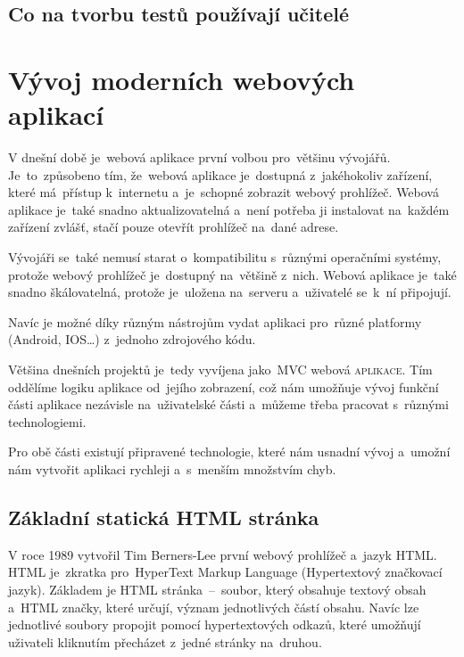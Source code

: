 \documentclass[14pt,a4paper]{article}
\begin{document}
        \subsection{Co na tvorbu testů používají učitelé}

    \section{Vývoj moderních webových aplikací}
    V dnešní době je~webová aplikace první volbou pro~většinu vývojářů. Je~to~způsobeno tím, že~webová aplikace je~dostupná z~jakéhokoliv zařízení, které má~přístup k~internetu a~je~schopné zobrazit webový prohlížeč. Webová aplikace je~také snadno aktualizovatelná a~není potřeba ji instalovat na~každém zařízení zvlášť, stačí pouze otevřít prohlížeč na~dané adrese.
    
    Vývojáři se~také nemusí starat o~kompatibilitu s~různými operačními systémy, protože webový prohlížeč
    je~dostupný na~většině z~nich. Webová aplikace je~také snadno škálovatelná, protože je~uložena na~serveru a~uživatelé se~k~ní připojují.
    
    Navíc je možné díky různým nástrojům vydat aplikaci pro~různé platformy (Android, IOS\dots) z~jednoho zdrojového kódu.\cite{adobe:webapp}

    Většina dnešních projektů je~tedy vyvíjena jako~MVC webová \textsc{aplikace}. Tím oddělíme logiku aplikace od~jejího zobrazení, což nám umožňuje vývoj funkční části aplikace nezávisle na~uživatelské části a~můžeme třeba pracovat s~různými technologiemi.
    
    Pro obě části existují připravené technologie, které nám usnadní vývoj a~umožní nám vytvořit aplikaci rychleji a~s~menším množstvím chyb.

    \cite{itnetworkBestPractices}

        \subsection{Základní statická HTML stránka}
        V roce 1989 vytvořil Tim Berners-Lee první webový prohlížeč a~jazyk HTML. HTML je~zkratka pro~HyperText Markup Language (Hypertextový značkovací jazyk).
        Základem je HTML stránka~--~soubor, který obsahuje textový obsah a~HTML značky, které určují, význam jednotlivých částí obsahu.
        Navíc lze jednotlivé soubory propojit pomocí hypertextových odkazů, které umožňují uživateli kliknutím přecházet z~jedné stránky na~druhou.
\end{document}
